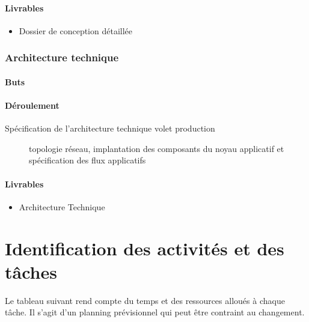 \paragraph{Livrables}
\begin{itemize}
    \item Dossier de conception détaillée
\end{itemize}

\subsubsection{Architecture technique}

\paragraph{Buts}

\paragraph{Déroulement}
\begin{description}
	\item[Spécification de l'architecture technique volet production]{
		topologie réseau, implantation des composants du noyau applicatif et spécification des flux applicatifs
    }
\end{description}
\paragraph{Livrables}
\begin{itemize}
    \item Architecture Technique
\end{itemize}


\section{Identification des activités et des tâches}
Le tableau suivant rend compte du temps et des ressources alloués à chaque tâche. Il s'agit d'un planning prévisionnel qui peut être contraint au changement.

